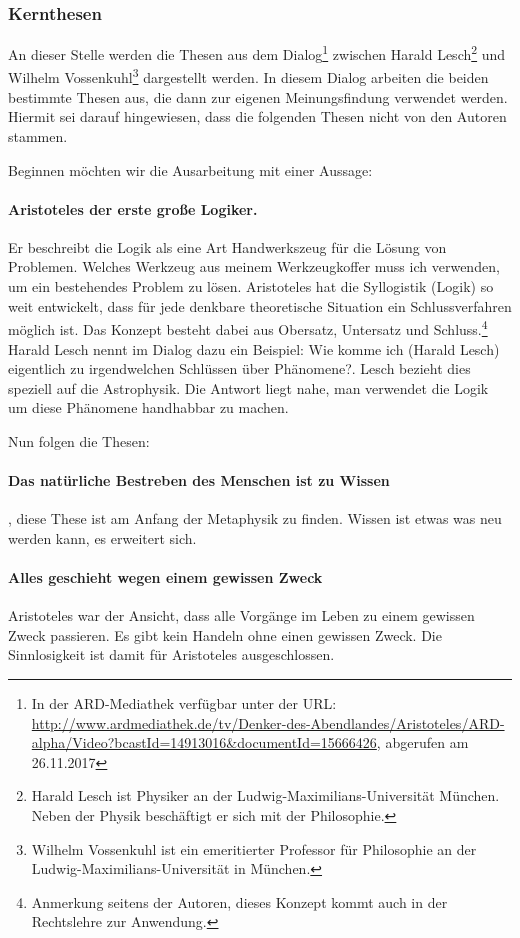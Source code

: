 \subsubsection{Kernthesen}

An dieser Stelle werden die Thesen aus dem Dialog\footnote{In der ARD-Mediathek verfügbar unter der URL: \url{http://www.ardmediathek.de/tv/Denker-des-Abendlandes/Aristoteles/ARD-alpha/Video?bcastId=14913016&documentId=15666426}, abgerufen am 26.11.2017} zwischen Harald Lesch\footnote{Harald Lesch ist Physiker an der Ludwig-Maximilians-Universität München. Neben der Physik beschäftigt er sich mit der Philosophie.} und Wilhelm Vossenkuhl\footnote{Wilhelm Vossenkuhl ist ein emeritierter Professor für Philosophie an der Ludwig-Maximilians-Universität in München.} dargestellt werden. In diesem Dialog arbeiten die beiden bestimmte Thesen aus, die dann zur eigenen Meinungsfindung verwendet werden. Hiermit sei darauf hingewiesen, dass die folgenden Thesen nicht von den Autoren stammen.

Beginnen möchten wir die Ausarbeitung mit einer Aussage:
\paragraph{\glqq Aristoteles der erste große Logiker\grqq. } Er beschreibt die Logik als eine Art Handwerkszeug für die Lösung von Problemen. Welches Werkzeug aus meinem Werkzeugkoffer muss ich verwenden, um ein bestehendes Problem zu lösen. Aristoteles hat die Syllogistik (Logik) so weit entwickelt, dass für jede denkbare theoretische Situation ein Schlussverfahren möglich ist. Das Konzept besteht dabei aus Obersatz, Untersatz und Schluss.\footnote{Anmerkung seitens der Autoren, dieses Konzept kommt auch in der Rechtslehre zur Anwendung.} Harald Lesch nennt im Dialog dazu ein Beispiel: \glqq Wie komme ich (Harald Lesch) eigentlich zu irgendwelchen Schlüssen über Phänomene?\grqq. Lesch bezieht dies speziell auf die Astrophysik. Die Antwort liegt nahe, man verwendet die Logik um diese Phänomene handhabbar zu machen.

Nun folgen die Thesen:
\paragraph{Das natürliche Bestreben des Menschen ist zu Wissen}, diese These ist am Anfang der Metaphysik zu finden. Wissen ist etwas was neu werden kann, es erweitert sich.  

\paragraph{Alles geschieht wegen einem gewissen Zweck} Aristoteles war der Ansicht, dass alle Vorgänge im Leben zu einem gewissen Zweck passieren. Es gibt kein Handeln ohne einen gewissen Zweck. Die Sinnlosigkeit ist damit für Aristoteles ausgeschlossen.


